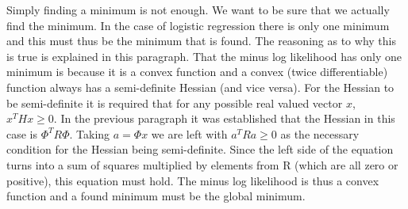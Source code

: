 \documentclass{scrartcl}
\newcommand\todo[1]{\textit{\textcolor{red}{#1}}}
\begin{document}
Simply finding a minimum is not enough. We want to be sure that we actually find the minimum. In the case of logistic regression there is only one minimum and this must thus be the minimum that is found. The reasoning as to why this is true is explained in this paragraph. That the minus log likelihood has only one minimum is because it is a convex function and a convex (twice differentiable) function always has a semi-definite Hessian (and vice versa). For the Hessian to be semi-definite it is required that for any possible real valued vector $x$, $x^{T}Hx\geq 0$. In the previous paragraph it was established that the Hessian in this case is $\Phi^{T} R \Phi$. Taking $a=\Phi x$ we are left with $a^{T}Ra\geq 0$ as the necessary condition for the Hessian being semi-definite. Since the left side of the equation turns into a sum of squares multiplied by elements from R (which are all zero or positive), this equation must hold. The minus log likelihood is thus a convex function and a found minimum must be the global minimum.

\end{document}
